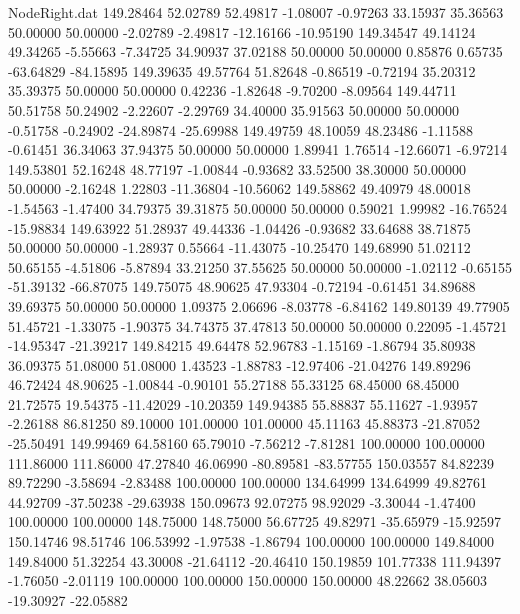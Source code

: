 \begin{filecontents}{NodeRight.dat}
 149.28464   52.02789   52.49817    -1.08007   -0.97263   33.15937   35.36563   50.00000   50.00000   -2.02789   -2.49817  -12.16166  -10.95190
 149.34547   49.14124   49.34265    -5.55663   -7.34725   34.90937   37.02188   50.00000   50.00000    0.85876    0.65735  -63.64829  -84.15895
 149.39635   49.57764   51.82648    -0.86519   -0.72194   35.20312   35.39375   50.00000   50.00000    0.42236   -1.82648   -9.70200   -8.09564
 149.44711   50.51758   50.24902    -2.22607   -2.29769   34.40000   35.91563   50.00000   50.00000   -0.51758   -0.24902  -24.89874  -25.69988
 149.49759   48.10059   48.23486    -1.11588   -0.61451   36.34063   37.94375   50.00000   50.00000    1.89941    1.76514  -12.66071   -6.97214
 149.53801   52.16248   48.77197    -1.00844   -0.93682   33.52500   38.30000   50.00000   50.00000   -2.16248    1.22803  -11.36804  -10.56062
 149.58862   49.40979   48.00018    -1.54563   -1.47400   34.79375   39.31875   50.00000   50.00000    0.59021    1.99982  -16.76524  -15.98834
 149.63922   51.28937   49.44336    -1.04426   -0.93682   33.64688   38.71875   50.00000   50.00000   -1.28937    0.55664  -11.43075  -10.25470
 149.68990   51.02112   50.65155    -4.51806   -5.87894   33.21250   37.55625   50.00000   50.00000   -1.02112   -0.65155  -51.39132  -66.87075
 149.75075   48.90625   47.93304    -0.72194   -0.61451   34.89688   39.69375   50.00000   50.00000    1.09375    2.06696   -8.03778   -6.84162
 149.80139   49.77905   51.45721    -1.33075   -1.90375   34.74375   37.47813   50.00000   50.00000    0.22095   -1.45721  -14.95347  -21.39217
 149.84215   49.64478   52.96783    -1.15169   -1.86794   35.80938   36.09375   51.08000   51.08000    1.43523   -1.88783  -12.97406  -21.04276
 149.89296   46.72424   48.90625    -1.00844   -0.90101   55.27188   55.33125   68.45000   68.45000   21.72575   19.54375  -11.42029  -10.20359
 149.94385   55.88837   55.11627    -1.93957   -2.26188   86.81250   89.10000  101.00000  101.00000   45.11163   45.88373  -21.87052  -25.50491
 149.99469   64.58160   65.79010    -7.56212   -7.81281  100.00000  100.00000  111.86000  111.86000   47.27840   46.06990  -80.89581  -83.57755
 150.03557   84.82239   89.72290    -3.58694   -2.83488  100.00000  100.00000  134.64999  134.64999   49.82761   44.92709  -37.50238  -29.63938
 150.09673   92.07275   98.92029    -3.30044   -1.47400  100.00000  100.00000  148.75000  148.75000   56.67725   49.82971  -35.65979  -15.92597
 150.14746   98.51746  106.53992    -1.97538   -1.86794  100.00000  100.00000  149.84000  149.84000   51.32254   43.30008  -21.64112  -20.46410
 150.19859  101.77338  111.94397    -1.76050   -2.01119  100.00000  100.00000  150.00000  150.00000   48.22662   38.05603  -19.30927  -22.05882

\end{filecontents}
